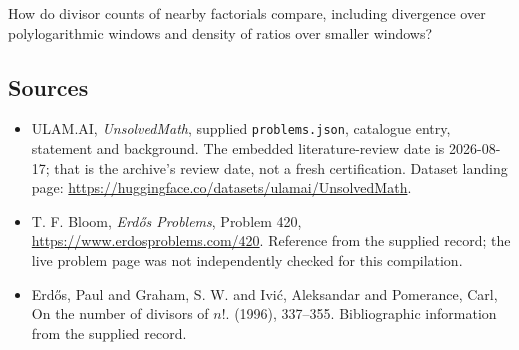 \documentclass[11pt,a4paper]{article}
\begin{document}
How do divisor counts of nearby factorials compare, including divergence over polylogarithmic windows and density of ratios over smaller windows?

\subsection{Sources}

{\small

\begin{itemize}

\item[\hypertarget{source:statement:1}{S1}] ULAM.AI, \emph{UnsolvedMath}, supplied \texttt{problems.json}, catalogue entry, statement and background. The embedded literature-review date is 2026-08-17; that is the archive’s review date, not a fresh certification. Dataset landing page: \url{https://huggingface.co/datasets/ulamai/UnsolvedMath}.

\item[\hypertarget{source:statement:2}{S2}] T. F. Bloom, \emph{Erdős Problems}, Problem 420, \url{https://www.erdosproblems.com/420}. Reference from the supplied record; the live problem page was not independently checked for this compilation.

\item[\hypertarget{source:statement:3}{S3}] Erd\H{o}s, Paul and Graham, S. W. and Ivi\'c, Aleksandar and Pomerance, Carl, On the number of divisors of {$n!$}. (1996), 337--355. Bibliographic information from the supplied record.

\end{itemize}

}

\label{end:statement}
\end{document}
